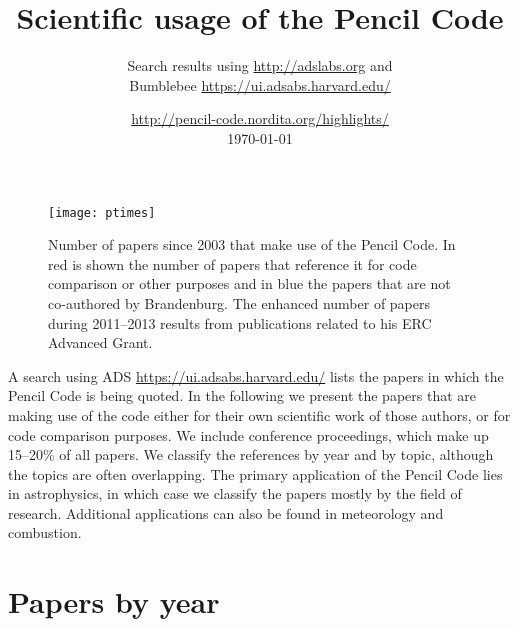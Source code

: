 \documentclass[12pt]{article}
\begin{document}
\title{Scientific usage of the {\sc Pencil Code}}
\author{Search results using \url{http://adslabs.org} and \\
Bumblebee \url{https://ui.adsabs.harvard.edu/}}
\date{\small\url{http://pencil-code.nordita.org/highlights/}\\\today}
\maketitle

\begin{wrapfigure}{r}{.65\textwidth}\begin{center}
\vspace{-2em}
\texttt{[image: ptimes]}
\vspace{-3em}
\end{center}\caption[]{\small
Number of papers since 2003 that make use of the {\sc Pencil Code}.
In red is shown the number of papers that reference it for code comparison
or other purposes and in blue the papers that are not co-authored
by Brandenburg.
The enhanced number of papers during 2011--2013 results from publications
related to his ERC Advanced Grant.
\vspace{-1em}
}\label{ptimes}\end{wrapfigure}

A search using ADS \url{https://ui.adsabs.harvard.edu/}
lists the papers in which the {\sc Pencil Code} is being quoted.
In the following we present the papers that are making use of
the code either for their own scientific work of those authors, or
for code comparison purposes.
We include conference proceedings, which make up 15--20\% of all papers.
We classify the references by year and by topic, although the topics are
often overlapping.
The primary application of the {\sc Pencil Code} lies in astrophysics,
in which case we classify the papers mostly by the field of research.
Additional applications can also be found in meteorology and combustion.

\section{Papers by year}
\end{document}
